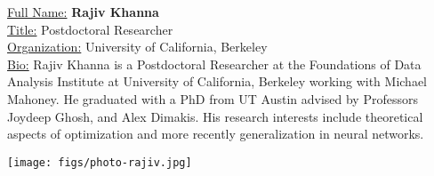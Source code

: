 \documentclass[11pt, oneside]{article}   	%
\begin{document}
\noindent
\begin{minipage}{.7\textwidth}
\underline{Full Name:} \textbf{Rajiv Khanna}\\
\underline{Title:} Postdoctoral Researcher\\
\underline{Organization:} University of California, Berkeley\\
\underline{Bio:} Rajiv Khanna is a Postdoctoral Researcher at the
Foundations of Data Analysis Institute at University of California,
Berkeley working with Michael Mahoney. He graduated with a PhD from UT
Austin advised by Professors Joydeep Ghosh, and Alex Dimakis.  His
research interests include theoretical aspects of optimization and
more recently generalization in neural networks.
\end{minipage}
\hfill
\begin{minipage}{.25\textwidth}
  \texttt{[image: figs/photo-rajiv.jpg]}
\end{minipage}
\vspace{5mm}
\end{document}
